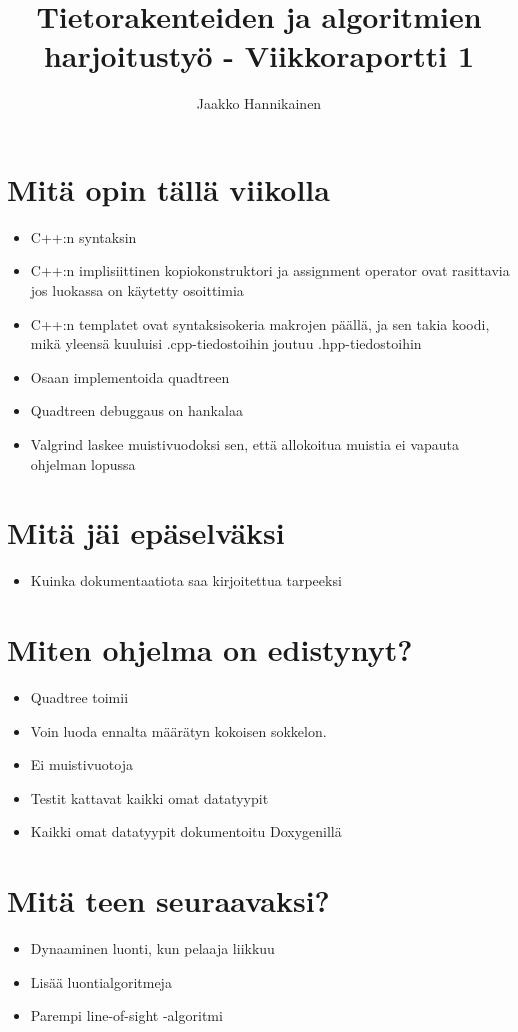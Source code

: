\documentclass{article}
\author{Jaakko Hannikainen}
\title{Tietorakenteiden ja algoritmien harjoitustyö - Viikkoraportti 1}
\begin{document}
\maketitle

\section{Mitä opin tällä viikolla}
\begin{itemize}
    \item C++:n syntaksin
    \item C++:n implisiittinen kopiokonstruktori ja assignment operator ovat
        rasittavia jos luokassa on käytetty osoittimia
    \item C++:n templatet ovat syntaksisokeria makrojen päällä, ja sen takia
        koodi, mikä yleensä kuuluisi .cpp-tiedostoihin joutuu .hpp-tiedostoihin
    \item Osaan implementoida quadtreen
    \item Quadtreen debuggaus on hankalaa
    \item Valgrind laskee muistivuodoksi sen, että allokoitua muistia ei vapauta
        ohjelman lopussa
\end{itemize}

\section{Mitä jäi epäselväksi}
\begin{itemize}
    \item Kuinka dokumentaatiota saa kirjoitettua tarpeeksi
\end{itemize}

\section{Miten ohjelma on edistynyt?}
\begin{itemize}
    \item Quadtree toimii
    \item Voin luoda ennalta määrätyn kokoisen sokkelon.
    \item Ei muistivuotoja
    \item Testit kattavat kaikki omat datatyypit
    \item Kaikki omat datatyypit dokumentoitu Doxygenillä
\end{itemize}

\section{Mitä teen seuraavaksi?}
\begin{itemize}
    \item Dynaaminen luonti, kun pelaaja liikkuu
    \item Lisää luontialgoritmeja
    \item Parempi line-of-sight -algoritmi
\end{itemize}

\texttt{}
\end{document}
